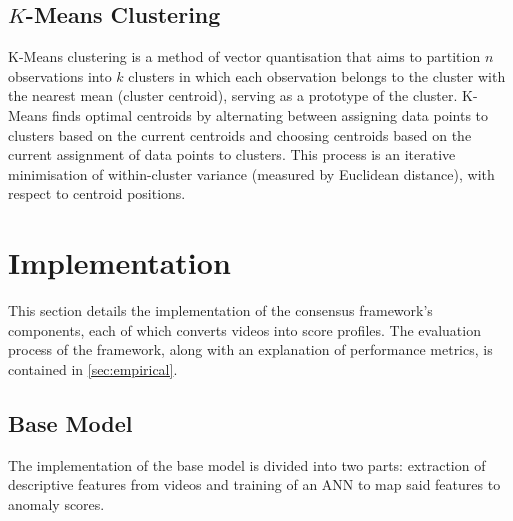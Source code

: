 \documentclass[sigplan,authorversion,nonacm, 9pt]{acmart}
\begin{document}
\subsection{$K$-Means Clustering}
K-Means clustering \cite{kmeans} is a method of vector quantisation that aims to partition $n$ observations into $k$ clusters in which each observation belongs to the cluster with the nearest mean (cluster centroid), serving as a prototype of the cluster.
K-Means finds optimal centroids by alternating between assigning data points to clusters based on the current centroids and choosing centroids based on the current assignment of data points to clusters. This process is an iterative minimisation of within-cluster variance (measured by Euclidean distance), with respect to centroid positions.

\section{Implementation} \label{sec:implementation}
This section details the implementation of the consensus framework's components, each of which converts videos into score profiles. The evaluation process of the framework, along with an explanation of performance metrics, is contained in \ref{sec:empirical}.

\subsection{Base Model}
The implementation of the base model is divided into two parts: extraction of descriptive features from videos and training of an ANN to map said features to anomaly scores. 
\par
\end{document}
